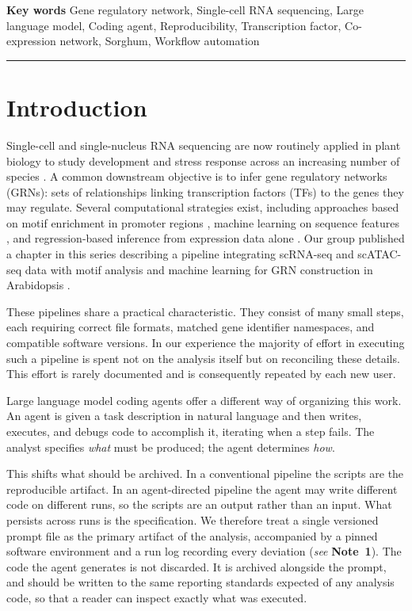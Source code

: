 \documentclass[11pt,a4paper]{article}
\newcommand{\seenote}[1]{(\textit{see} \textbf{Note~#1})}
\begin{document}
\vspace{0.6em}
\textbf{Key words} Gene regulatory network, Single-cell RNA sequencing, Large language model, Coding agent, Reproducibility, Transcription factor, Co-expression network, Sorghum, Workflow automation

\vspace{0.8em}
\hrule

\section{Introduction}

Single-cell and single-nucleus RNA sequencing are now routinely applied in plant biology to study development and stress response across an increasing number of species \cite{ryu2019,denyer2019,dorrity2021,shahan2022,marand2021}. A common downstream objective is to infer gene regulatory networks (GRNs): sets of relationships linking transcription factors (TFs) to the genes they may regulate. Several computational strategies exist, including approaches based on motif enrichment in promoter regions \cite{kulkarni2018,grant2011}, machine learning on sequence features \cite{song2020}, and regression-based inference from expression data alone \cite{moerman2019,vandesande2020,aibar2017}. Our group published a chapter in this series describing a pipeline integrating scRNA-seq and scATAC-seq data with motif analysis and machine learning for GRN construction in Arabidopsis \cite{chau2023}.

These pipelines share a practical characteristic. They consist of many small steps, each requiring correct file formats, matched gene identifier namespaces, and compatible software versions. In our experience the majority of effort in executing such a pipeline is spent not on the analysis itself but on reconciling these details. This effort is rarely documented and is consequently repeated by each new user.

Large language model coding agents offer a different way of organizing this work. An agent is given a task description in natural language and then writes, executes, and debugs code to accomplish it, iterating when a step fails. The analyst specifies \textit{what} must be produced; the agent determines \textit{how}.

This shifts what should be archived. In a conventional pipeline the scripts are the reproducible artifact. In an agent-directed pipeline the agent may write different code on different runs, so the scripts are an output rather than an input. What persists across runs is the specification. We therefore treat a single versioned prompt file as the primary artifact of the analysis, accompanied by a pinned software environment and a run log recording every deviation \seenote{1}. The code the agent generates is not discarded. It is archived alongside the prompt, and should be written to the same reporting standards expected of any analysis code, so that a reader can inspect exactly what was executed.
\end{document}
